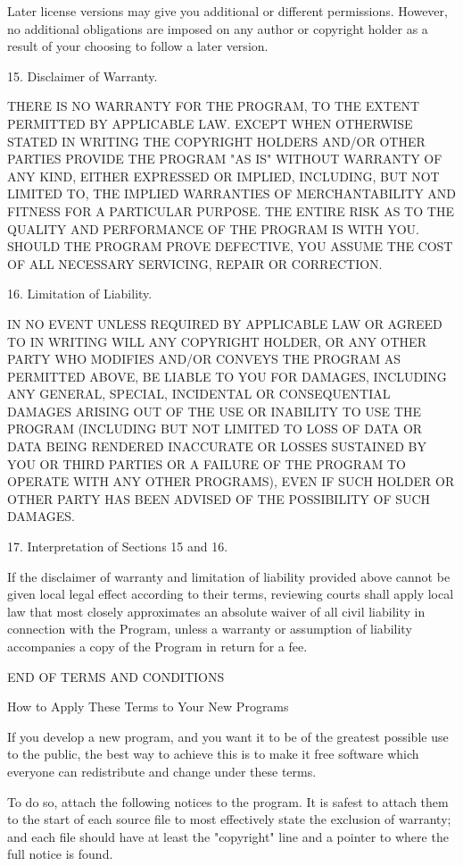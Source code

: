 \documentclass[parskip=half]{scrartcl}
\begin{document}
  Later license versions may give you additional or different
permissions.  However, no additional obligations are imposed on any
author or copyright holder as a result of your choosing to follow a
later version.

  15. Disclaimer of Warranty.

  THERE IS NO WARRANTY FOR THE PROGRAM, TO THE EXTENT PERMITTED BY
APPLICABLE LAW.  EXCEPT WHEN OTHERWISE STATED IN WRITING THE COPYRIGHT
HOLDERS AND/OR OTHER PARTIES PROVIDE THE PROGRAM "AS IS" WITHOUT WARRANTY
OF ANY KIND, EITHER EXPRESSED OR IMPLIED, INCLUDING, BUT NOT LIMITED TO,
THE IMPLIED WARRANTIES OF MERCHANTABILITY AND FITNESS FOR A PARTICULAR
PURPOSE.  THE ENTIRE RISK AS TO THE QUALITY AND PERFORMANCE OF THE PROGRAM
IS WITH YOU.  SHOULD THE PROGRAM PROVE DEFECTIVE, YOU ASSUME THE COST OF
ALL NECESSARY SERVICING, REPAIR OR CORRECTION.

  16. Limitation of Liability.

  IN NO EVENT UNLESS REQUIRED BY APPLICABLE LAW OR AGREED TO IN WRITING
WILL ANY COPYRIGHT HOLDER, OR ANY OTHER PARTY WHO MODIFIES AND/OR CONVEYS
THE PROGRAM AS PERMITTED ABOVE, BE LIABLE TO YOU FOR DAMAGES, INCLUDING ANY
GENERAL, SPECIAL, INCIDENTAL OR CONSEQUENTIAL DAMAGES ARISING OUT OF THE
USE OR INABILITY TO USE THE PROGRAM (INCLUDING BUT NOT LIMITED TO LOSS OF
DATA OR DATA BEING RENDERED INACCURATE OR LOSSES SUSTAINED BY YOU OR THIRD
PARTIES OR A FAILURE OF THE PROGRAM TO OPERATE WITH ANY OTHER PROGRAMS),
EVEN IF SUCH HOLDER OR OTHER PARTY HAS BEEN ADVISED OF THE POSSIBILITY OF
SUCH DAMAGES.

  17. Interpretation of Sections 15 and 16.

  If the disclaimer of warranty and limitation of liability provided
above cannot be given local legal effect according to their terms,
reviewing courts shall apply local law that most closely approximates
an absolute waiver of all civil liability in connection with the
Program, unless a warranty or assumption of liability accompanies a
copy of the Program in return for a fee.

                     END OF TERMS AND CONDITIONS

            How to Apply These Terms to Your New Programs

  If you develop a new program, and you want it to be of the greatest
possible use to the public, the best way to achieve this is to make it
free software which everyone can redistribute and change under these terms.

  To do so, attach the following notices to the program.  It is safest
to attach them to the start of each source file to most effectively
state the exclusion of warranty; and each file should have at least
the "copyright" line and a pointer to where the full notice is found.
\end{document}
